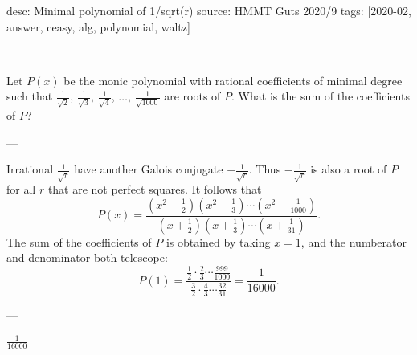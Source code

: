desc: Minimal polynomial of 1/sqrt(r)
source: HMMT Guts 2020/9
tags: [2020-02, answer, ceasy, alg, polynomial, waltz]

---

Let $P(x)$ be the monic polynomial with rational coefficients of minimal degree such that $\frac1{\sqrt2}$, $\frac1{\sqrt3}$, $\frac1{\sqrt4}$, $\ldots$, $\frac1{\sqrt{1000}}$ are roots of $P$. What is the sum of the coefficients of $P$?

---

Irrational $\frac1{\sqrt r}$ have another Galois conjugate $-\frac1{\sqrt r}$. Thus $-\frac1{\sqrt r}$ is also a root of $P$ for all $r$ that are not perfect squares. It follows that \[P(x)=\frac{(x^2-\frac12)(x^2-\frac13)\cdots(x^2-\frac1{1000})}{(x+\frac12)(x+\frac13)\cdots(x+\frac1{31})}.\]
The sum of the coefficients of $P$ is obtained by taking $x=1$, and the numberator and denominator both telescope: \[P(1)=\frac{\frac12\cdot\frac23\cdots\frac{999}{1000}}{\frac32\cdot\frac43\cdots\frac{32}{31}}=\frac1{16000}.\]

---

$\frac1{16000}$
